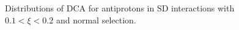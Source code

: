 \begin{figure}[h!]
\begin{subfigure}{.45\textwidth}
	\end{subfigure}
	\caption{Distributions of DCA for antiprotons in SD interactions with $0.1 < \xi<0.2$ and normal selection.}
	\label{fig:dca_proton_bar_2t}
\end{figure}